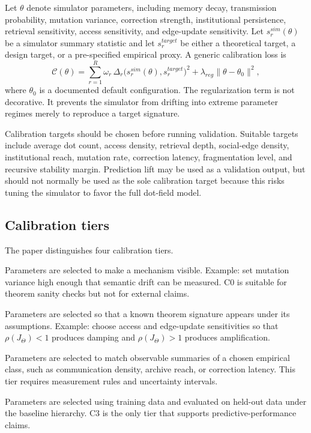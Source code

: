 \documentclass[11pt]{article}
\theoremstyle{remark}
\begin{document}
Let $\theta$ denote simulator parameters, including memory decay, transmission probability, mutation variance, correction strength, institutional persistence, retrieval sensitivity, access sensitivity, and edge-update sensitivity. Let $s_r^{sim}(\theta)$ be a simulator summary statistic and let $s_r^{target}$ be either a theoretical target, a design target, or a pre-specified empirical proxy. A generic calibration loss is
\[
\mathcal C(\theta)=
\sum_{r=1}^{R}\omega_r\,\Delta_r\big(s_r^{sim}(\theta),s_r^{target}\big)^2
+\lambda_{reg}\|\theta-\theta_0\|^2,
\]
where $\theta_0$ is a documented default configuration. The regularization term is not decorative. It prevents the simulator from drifting into extreme parameter regimes merely to reproduce a target signature.

Calibration targets should be chosen before running validation. Suitable targets include average dot count, access density, retrieval depth, social-edge density, institutional reach, mutation rate, correction latency, fragmentation level, and recursive stability margin. Prediction lift may be used as a validation output, but should not normally be used as the sole calibration target because this risks tuning the simulator to favor the full dot-field model.

\subsection{Calibration tiers}\label{calibration-tiers}

The paper distinguishes four calibration tiers.

\begin{description}[leftmargin=3.2cm,style=nextline]
\item[Tier C0: design calibration]
Parameters are selected to make a mechanism visible. Example: set mutation variance high enough that semantic drift can be measured. C0 is suitable for theorem sanity checks but not for external claims.

\item[Tier C1: signature calibration]
Parameters are selected so that a known theorem signature appears under its assumptions. Example: choose access and edge-update sensitivities so that $\rho(J_\Theta)<1$ produces damping and $\rho(J_\Theta)>1$ produces amplification.

\item[Tier C2: distributional calibration]
Parameters are selected to match observable summaries of a chosen empirical class, such as communication density, archive reach, or correction latency. This tier requires measurement rules and uncertainty intervals.

\item[Tier C3: predictive calibration]
Parameters are selected using training data and evaluated on held-out data under the baseline hierarchy. C3 is the only tier that supports predictive-performance claims.
\end{description}
\end{document}
